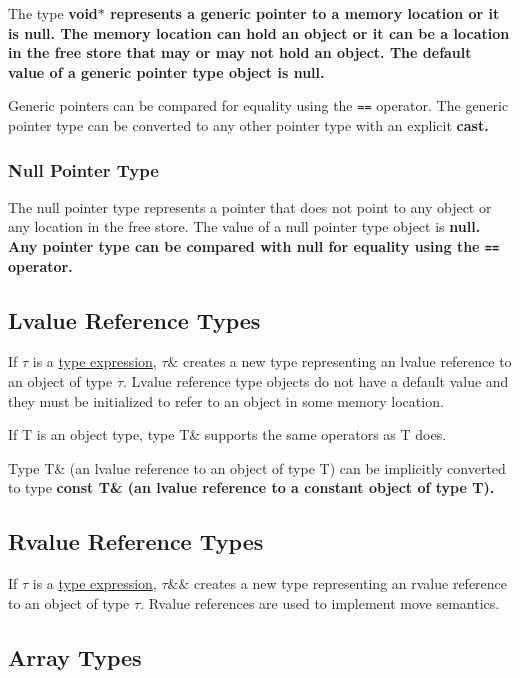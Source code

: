 \documentclass[a4paper,oneside,11pt]{article}
\begin{document}
The type \bf{void$*$} represents a generic pointer to a memory location or it is \bf{null}.
The memory location can hold an object or it can be a location in the free store that
may or may not hold an object.
The default value of a generic pointer type object is \bf{null}.

Generic pointers can be compared for equality using the \texttt{==} operator.
The generic pointer type can be converted to any other pointer type with an explicit \bf{cast}.

\subsubsection{Null Pointer Type}

The null pointer type represents a pointer that does not point to any object or any location in the free store.
The value of a null pointer type object is \bf{null}.
Any pointer type can be compared with \bf{null} for equality using the \texttt{==} operator.

\subsection{Lvalue Reference Types}\label{sec:lvaluereferencetypes}

If $\tau$ is a \hyperref[typeexpr]{type expression}, $\tau\&$ creates a new type representing an lvalue reference to an object of type $\tau$.
Lvalue reference type objects do not have a default value and they must be initialized to refer to an object in some memory location.

If T is an object type, type T\& supports the same operators as T does.

Type T\& (an lvalue reference to an object of type T) can be implicitly converted to type \bf{const} T\&
(an lvalue reference to a constant object of type T).

\subsection{Rvalue Reference Types}\label{sec:rvaluereferencetypes}

If $\tau$ is a \hyperref[typeexpr]{type expression}, $\tau\&\&$ creates a new type representing an rvalue reference to an object of type $\tau$.
Rvalue references are used to implement move semantics.

\subsection{Array Types}\label{sec:arraytypes}
\end{document}
